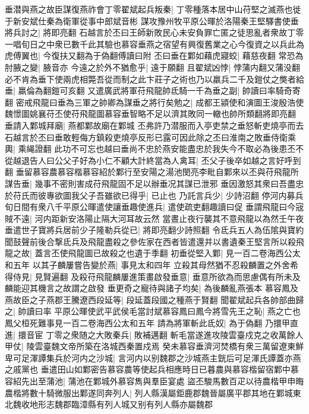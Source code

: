 垂潜與燕之故臣謀復燕祚會丁零翟斌起兵叛秦|{
	丁零種落本居中山苻堅之滅燕也徙于新安斌仕秦為衛軍從事中郎斌音彬}
謀攻豫州牧平原公暉於洛陽秦王堅驛書使垂將兵討之|{
	將即亮翻}
石越言於丕曰王師新敗民心未安負罪亡匿之徒思亂者衆故丁零一唱旬日之中衆已數千此其驗也慕容垂燕之宿望有興復舊業之心今復資之以兵此為虎傅翼也|{
	今復扶又翻為于偽翻傅讀曰附}
丕曰垂在鄴如藉虎寢蛟|{
	藉慈夜翻}
常恐為肘腋之變|{
	腋音亦}
今遠之於外不猶愈乎|{
	遠于願翻}
且翟斌凶悖|{
	悖蒲内翻又蒲没翻}
必不肯為垂下使兩虎相斃吾從而制之此卞莊子之術也乃以羸兵二千及鎧仗之獘者給垂|{
	羸倫為翻鎧可亥翻}
又遣廣武將軍苻飛龍帥氐騎一千為垂之副|{
	帥讀曰率騎奇寄翻}
密戒飛龍曰垂為三軍之帥卿為謀垂之將行矣勉之|{
	成都王潁使和演圖王浚殷浩使魏憬圖姚襄苻丕使苻飛龍圖慕容垂智略不足以濟其敗同一轍也帥所類翻將即亮翻}
垂請入鄴城拜廟|{
	燕都鄴故廟在鄴城}
丕弗許乃潜服而入亭吏禁之垂怒斬吏燒亭而去石越言於丕曰垂敢輕侮方鎮殺吏燒亭反形已露可因此除之丕曰淮南之敗垂侍衛乘輿|{
	乘䋲證翻}
此功不可忘也越曰垂尚不忠於燕安能盡忠於我失今不取必為後患丕不從越退告人曰公父子好為小仁不顧大計終當為人禽耳|{
	丕父子後卒如越之言好呼到翻}
垂留慕容農慕容楷慕容紹於鄴行至安陽之湯池閔亮李毗自鄴來以丕與苻飛龍所謀告垂|{
	幾事不密則害成苻飛龍固不足以辦垂况其謀已泄邪}
垂因激怒其衆曰吾盡忠於苻氏而彼專欲圖我父子吾雖欲已得乎|{
	已止也}
乃託言兵少|{
	少詩沼翻}
停河内募兵旬日間有衆八千平原公暉遣使讓垂趣使進兵|{
	遣使疏吏翻趣讀曰促}
垂謂飛龍曰今宼賊不遠|{
	河内距新安洛陽止隔大河耳故云然}
當晝止夜行襲其不意飛龍以為然壬午夜垂遣世子寶將兵居前少子隆勒兵從已|{
	將即亮翻少詩照翻}
令氐兵五人為伍隂與寶約聞鼓聲前後合撃氐兵及飛龍盡殺之參佐家在西者皆遣還并以書遺秦王堅言所以殺飛龍之故|{
	蓋言丕使飛龍圖已故殺之也遺于季翻}
初垂從堅入鄴|{
	見一百二卷海西公太和五年}
以其子麟屢嘗告變於燕|{
	事見太和四年}
立殺其母然猶不忍殺麟置之外舍希得侍見|{
	見賢遍翻}
及殺苻飛龍麟屢進策畫啟發垂意|{
	垂意所欲為而思慮偶有所未及麟能迎其機言之故謂之啟發}
垂更奇之寵待與諸子均矣|{
	為後麟亂燕張本}
慕容鳳及燕故臣之子燕郡王騰遼西段延等|{
	段延蓋段國之種燕于賢翻}
聞翟斌起兵各帥部曲歸之|{
	帥讀曰率}
平原公暉使武平武侯毛當討斌慕容鳳曰鳳今將雪先王之恥|{
	燕之亡也鳳父桓死難事見一百二卷海西公太和五年}
請為將軍斬此氐奴|{
	為于偽翻}
乃擐甲直進|{
	擐音宦}
丁零之衆随之大敗秦兵|{
	敗補邁翻}
斬毛當遂進攻陵雲臺戍克之收萬餘人甲仗|{
	陵雲臺魏文帝所築在洛城西秦置戍焉}
癸未慕容垂濟河焚橋有衆三萬留遼東鮮卑可足渾譚集兵於河内之沙城|{
	言河内以别魏郡之沙城燕主皝后可足渾氏譚蓋亦燕之戚黨也}
垂遣田山如鄴密告慕容農等使起兵相應時日已暮農與慕容楷留宿鄴中慕容紹先出至蒲池|{
	蒲池在鄴城外慕容雋與羣臣宴處}
盜丕駿馬數百疋以待農楷甲申晦農楷將數十騎微服出鄴遂同奔列人|{
	列人縣漢屬鉅鹿郡魏晉屬廣平郡其地在鄴城東北魏收地形志魏郡臨漳縣有列人城又别有列人縣亦屬魏郡}
